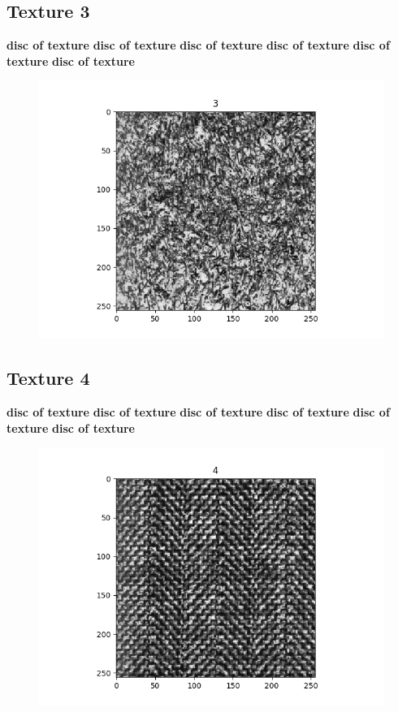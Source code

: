 \documentclass{article}
\begin{document}
\subsection{Texture 3}
\textbf{disc of texture}
\textbf{disc of texture}
\textbf{disc of texture}
\textbf{disc of texture}
\textbf{disc of texture}
\textbf{disc of texture}
\begin{figure}[h!]
\includegraphics[scale=0.5]{3.png}
\end{figure}


\subsection{Texture 4}
\textbf{disc of texture}
\textbf{disc of texture}
\textbf{disc of texture}
\textbf{disc of texture}
\textbf{disc of texture}
\textbf{disc of texture}
\begin{figure}[h!]
\includegraphics[scale=0.5]{4.png}
\end{figure}
\newpage
\end{document}
